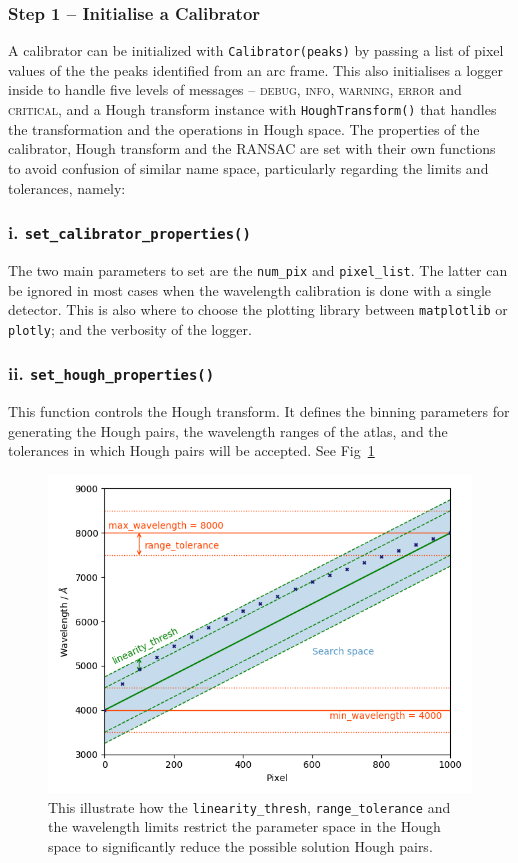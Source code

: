 \documentclass{aa}
\begin{document}
\subsubsection*{Step 1 -- Initialise a Calibrator}
A calibrator can be initialized with \texttt{Calibrator(peaks)} by passing a list
of pixel values of the the peaks identified from an arc frame. This also
initialises a logger inside to handle five levels of messages -- \textsc{debug},
\textsc{info}, \textsc{warning}, \textsc{error} and \textsc{critical}, and a
Hough transform instance with \texttt{HoughTransform()} that handles the
transformation and the operations in Hough space. The properties of the
calibrator, Hough transform and the RANSAC are set with their own functions to
avoid confusion of similar name space, particularly regarding the limits and
tolerances, namely:

\subsubsection*{i. \texttt{set\_calibrator\_properties()}}
The two main parameters to set are the \texttt{num\_pix} and \texttt{pixel\_list}.
The latter can be ignored in most cases when the wavelength calibration is done
with a single detector. This is also where to choose the plotting library between
\texttt{matplotlib} or \texttt{plotly}; and the verbosity of the logger.

\subsubsection*{ii. \texttt{set\_hough\_properties()}}
This function controls the Hough transform. It defines the binning parameters for
generating the Hough pairs, the wavelength ranges of the atlas, and the tolerances
in which Hough pairs will be accepted. See Fig~\ref{fig:threshold}

\begin{figure}[h]
    \centering
    \includegraphics[width=\columnwidth]{figure_1_threshold_plot.png}
    \caption{This illustrate how the \texttt{linearity\_thresh},
    \texttt{range\_tolerance} and the wavelength limits restrict the parameter
    space in the Hough space to significantly reduce the possible solution Hough
    pairs.}
    \label{fig:threshold}
\end{figure}
\end{document}
